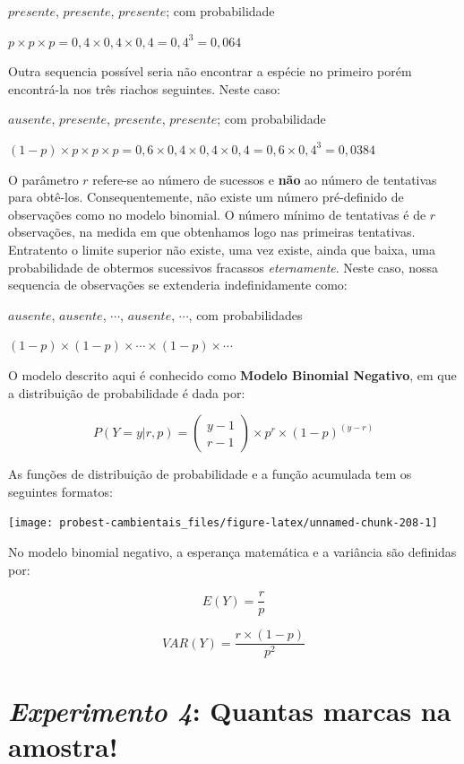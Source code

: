 \documentclass[
]{book}
\begin{document}
\(presente\), \(presente\), \(presente\); com probabilidade

\(p \times p \times p = 0,4 \times 0,4 \times 0,4 = 0,4^3 = 0,064\)

Outra sequencia possível seria não encontrar a espécie no primeiro porém encontrá-la nos três riachos seguintes. Neste caso:

\(ausente\), \(presente\), \(presente\), \(presente\); com probabilidade

\((1 - p) \times p \times p \times p = 0,6 \times 0,4 \times 0,4 \times 0,4 = 0,6 \times 0,4^3 = 0,0384\)

O parâmetro \(r\) refere-se ao número de sucessos e \textbf{não} ao número de tentativas para obtê-los. Consequentemente, não existe um número pré-definido de observações como no modelo binomial. O número mínimo de tentativas é de \(r\) observações, na medida em que obtenhamos logo nas primeiras tentativas. Entratento o limite superior não existe, uma vez existe, ainda que baixa, uma probabilidade de obtermos sucessivos fracassos \emph{eternamente}. Neste caso, nossa sequencia de observações se extenderia indefinidamente como:

\(ausente\), \(ausente\), \(\cdots\), \(ausente\), \(\cdots\), com probabilidades

\((1-p) \times (1-p) \times \cdots \times (1-p) \times \cdots\)

O modelo descrito aqui é conhecido como \textbf{Modelo Binomial Negativo}, em que a distribuição de probabilidade é dada por:

\[P(Y = y|r,p) = \left (\begin{array}{c}
y - 1 \\
r - 1
\end{array}\right) \times p^{r} \times (1-p)^{(y-r)}\]

As funções de distribuição de probabilidade e a função acumulada tem os seguintes formatos:

\begin{center}\texttt{[image: probest-cambientais\_files/figure-latex/unnamed-chunk-208-1]} \end{center}

No modelo binomial negativo, a esperança matemática e a variância são definidas por:

\[E(Y) = \frac{r}{p}\]

\[VAR(Y) = \frac{r \times (1-p)}{p^2}\]

\hypertarget{experimento-4-quantas-marcas-na-amostra}{%
\section{\texorpdfstring{\emph{Experimento 4}: Quantas marcas na amostra!}{Experimento 4: Quantas marcas na amostra!}}\label{experimento-4-quantas-marcas-na-amostra}}
\end{document}
